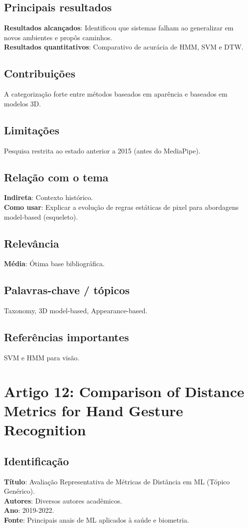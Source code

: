 \documentclass[12pt, a4paper]{article}
\begin{document}
\subsection{Principais resultados}
\textbf{Resultados alcançados}: Identificou que sistemas falham ao generalizar em novos ambientes e propôs caminhos.\\
\textbf{Resultados quantitativos}: Comparativo de acurácia de HMM, SVM e DTW.\\
\subsection{Contribuições}
A categorização forte entre métodos baseados em aparência e baseados em modelos 3D.\\
\subsection{Limitações}
Pesquisa restrita ao estado anterior a 2015 (antes do MediaPipe).\\
\subsection{Relação com o tema}
\textbf{Indireta}: Contexto histórico.\\
\textbf{Como usar}: Explicar a evolução de regras estáticas de pixel para abordagens model-based (esqueleto).\\
\subsection{Relevância}
\textbf{Média}: Ótima base bibliográfica.\\
\subsection{Palavras-chave / tópicos}
Taxonomy, 3D model-based, Appearance-based.\\
\subsection{Referências importantes}
SVM e HMM para visão.
\newpage

\section{Artigo 12: Comparison of Distance Metrics for Hand Gesture Recognition}
\subsection{Identificação}
\textbf{Título}: Avaliação Representativa de Métricas de Distância em ML (Tópico Genérico).\\
\textbf{Autores}: Diversos autores acadêmicos.\\
\textbf{Ano}: 2019-2022.\\
\textbf{Fonte}: Principais anais de ML aplicados à saúde e biometria.\\
\end{document}
